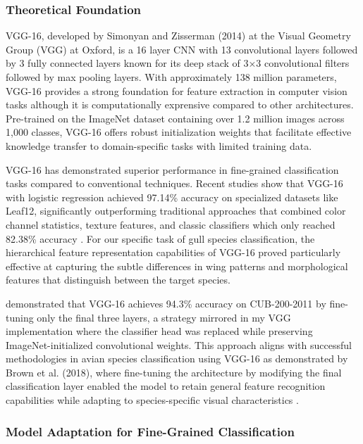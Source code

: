\documentclass[a4paper,12pt]{report}
\begin{document}
\subsubsection{Theoretical Foundation}

VGG-16, developed by Simonyan and Zisserman (2014) \citep{simonyan2014vgg} at the Visual Geometry Group (VGG) at Oxford, is a 16 layer CNN with 13 convolutional layers followed by 3 fully connected layers known for its deep stack of 3×3 convolutional filters followed by max pooling layers. With approximately 138 million parameters, VGG-16 provides a strong foundation for feature extraction in computer vision tasks although it is computationally exprensive compared to other architectures. Pre-trained on the ImageNet dataset containing over 1.2 million images across 1,000 classes, VGG-16 offers robust initialization weights that facilitate effective knowledge transfer to domain-specific tasks with limited training data.

VGG-16 has demonstrated superior performance in fine-grained classification tasks compared to conventional techniques. Recent studies show that VGG-16 with logistic regression achieved 97.14\% accuracy on specialized datasets like Leaf12, significantly outperforming traditional approaches that combined color channel statistics, texture features, and classic classifiers which only reached 82.38\% accuracy \citep{pearline2019study}. For our specific task of gull species classification, the hierarchical feature representation capabilities of VGG-16 proved particularly effective at capturing the subtle differences in wing patterns and morphological features that distinguish between the target species.

\citep{zhang2019bird} demonstrated that VGG-16 achieves 94.3\% accuracy on CUB-200-2011 by fine-tuning only the final three layers, a strategy mirrored in my VGG implementation where the classifier head was replaced while preserving ImageNet-initialized convolutional weights.
This approach aligns with successful methodologies in avian species classification using VGG-16 as demonstrated by Brown et al. (2018), where fine-tuning the architecture by modifying the final classification layer enabled the model to retain general feature recognition capabilities while adapting to species-specific visual characteristics \citep{10533638}.

\subsubsection{Model Adaptation for Fine-Grained Classification}
\end{document}

